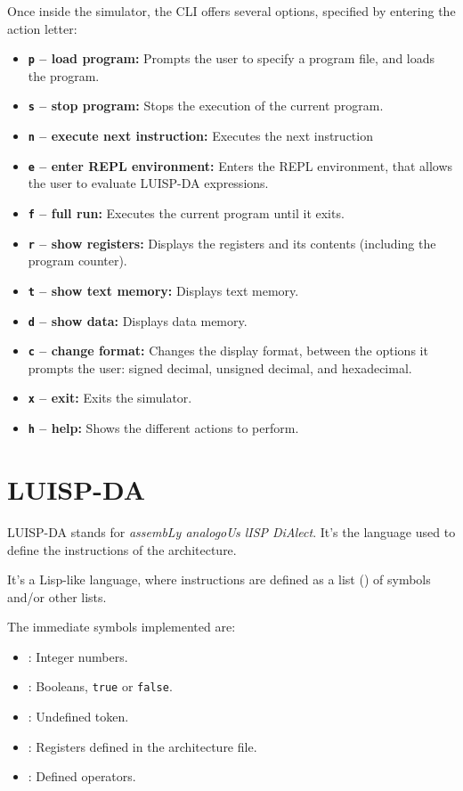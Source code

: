 Once inside the simulator, the CLI offers several options, specified by entering the action letter:
\begin{itemize}
  \item \textbf{\texttt{p} -- load program:} Prompts the user to specify a program file, and loads the program.
  \item \textbf{\texttt{s} -- stop program:} Stops the execution of the current program.
  \item \textbf{\texttt{n} -- execute next instruction:} Executes the next instruction
  \item \textbf{\texttt{e} -- enter REPL environment:} Enters the REPL environment, that allows the user to evaluate LUISP-DA expressions.
  \item \textbf{\texttt{f} -- full run:} Executes the current program until it exits.
  \item \textbf{\texttt{r} -- show registers:} Displays the registers and its contents (including the program counter).
  \item \textbf{\texttt{t} -- show text memory:} Displays text memory.
  \item \textbf{\texttt{d} -- show data:} Displays data memory.
  \item \textbf{\texttt{c} -- change format:} Changes the display format, between the options it prompts the user: signed decimal, unsigned decimal, and hexadecimal.
  \item \textbf{\texttt{x} -- exit:} Exits the simulator.
  \item \textbf{\texttt{h} -- help:} Shows the different actions to perform.
\end{itemize}



\section*{LUISP-DA}
LUISP-DA stands for \textit{assembLy analogoUs lISP DiAlect}. It's the language used to define the instructions of the architecture.

It's a Lisp-like language, where instructions are defined as a list () of symbols and/or other lists.

The immediate symbols implemented are:
\begin{itemize}
  \item {}: Integer numbers.
  \item {}: Booleans, \texttt{true} or \texttt{false}.
  \item {}: Undefined token.
  \item {}: Registers defined in the architecture file.
  \item {}: Defined operators.
\end{itemize}

